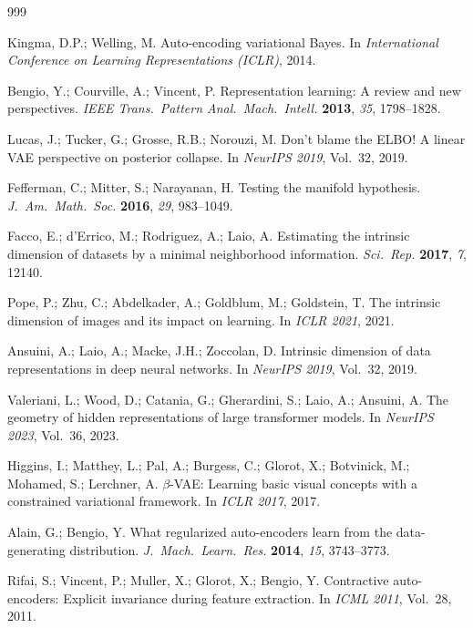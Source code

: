 \documentclass[make,article,submit,pdftex,moreauthors]{Definitions/mdpi}
\begin{document}
\begin{thebibliography}{999}

Kingma, D.P.; Welling, M.
Auto-encoding variational Bayes.
In \textit{International Conference on Learning Representations (ICLR)},
2014.

Bengio, Y.; Courville, A.; Vincent, P.
Representation learning: A review and new perspectives.
\textit{IEEE Trans.\ Pattern Anal.\ Mach.\ Intell.} \textbf{2013},
\textit{35}, 1798--1828.

Lucas, J.; Tucker, G.; Grosse, R.B.; Norouzi, M.
Don't blame the ELBO! A linear VAE perspective on posterior collapse.
In \textit{NeurIPS 2019}, Vol.~32, 2019.

Fefferman, C.; Mitter, S.; Narayanan, H.
Testing the manifold hypothesis.
\textit{J.\ Am.\ Math.\ Soc.} \textbf{2016}, \textit{29}, 983--1049.

Facco, E.; d'Errico, M.; Rodriguez, A.; Laio, A.
Estimating the intrinsic dimension of datasets by a minimal neighborhood
information.
\textit{Sci.\ Rep.} \textbf{2017}, \textit{7}, 12140.

Pope, P.; Zhu, C.; Abdelkader, A.; Goldblum, M.; Goldstein, T.
The intrinsic dimension of images and its impact on learning.
In \textit{ICLR 2021}, 2021.

Ansuini, A.; Laio, A.; Macke, J.H.; Zoccolan, D.
Intrinsic dimension of data representations in deep neural networks.
In \textit{NeurIPS 2019}, Vol.~32, 2019.

Valeriani, L.; Wood, D.; Catania, G.; Gherardini, S.; Laio, A.; Ansuini, A.
The geometry of hidden representations of large transformer models.
In \textit{NeurIPS 2023}, Vol.~36, 2023.

Higgins, I.; Matthey, L.; Pal, A.; Burgess, C.; Glorot, X.; Botvinick, M.;
Mohamed, S.; Lerchner, A.
$\beta$-VAE: Learning basic visual concepts with a constrained variational
framework.
In \textit{ICLR 2017}, 2017.

Alain, G.; Bengio, Y.
What regularized auto-encoders learn from the data-generating distribution.
\textit{J.\ Mach.\ Learn.\ Res.} \textbf{2014}, \textit{15}, 3743--3773.

Rifai, S.; Vincent, P.; Muller, X.; Glorot, X.; Bengio, Y.
Contractive auto-encoders: Explicit invariance during feature extraction.
In \textit{ICML 2011}, Vol.~28, 2011.


\end{thebibliography}
\end{document}
